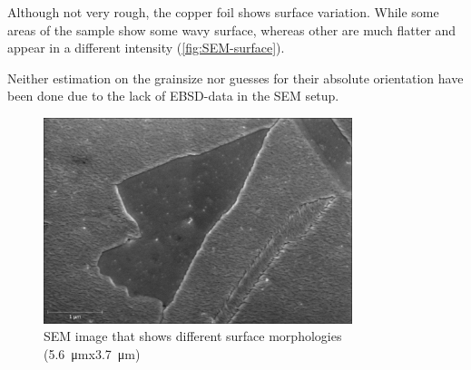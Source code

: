 Although not very rough, the copper foil shows surface variation. While some areas of the sample show some wavy surface, whereas other are much flatter and appear in a different intensity (\autoref{fig:SEM-surface}).

Neither estimation on the grainsize nor guesses for their absolute orientation have been done due to the lack of EBSD-data in the SEM setup.

\begin{figure}[]
	\begin{center}
		\includegraphics[height=6cm]{./images/Domenik_16031700.jpg}
	\end{center}
	\caption{SEM image that shows different surface morphologies (\SI{5.6}{\micro \meter}x\SI{3.7}{\micro \meter})}
	\label{fig:SEM-surface}
\end{figure}

